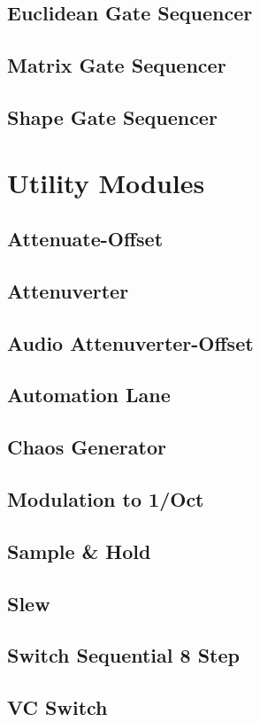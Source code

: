 \documentclass[11pt]{book}
\begin{document}
\section{Euclidean Gate Sequencer}
\section{Matrix Gate Sequencer}
\section{Shape Gate Sequencer}

\chapter{Utility Modules}
\section{Attenuate-Offset}
\section{Attenuverter}
\section{Audio Attenuverter-Offset}
\section{Automation Lane}
\section{Chaos Generator}
\section{Modulation to 1/Oct}
\section{Sample \& Hold}
\section{Slew}
\section{Switch Sequential 8 Step}
\section{VC Switch}
\end{document}
